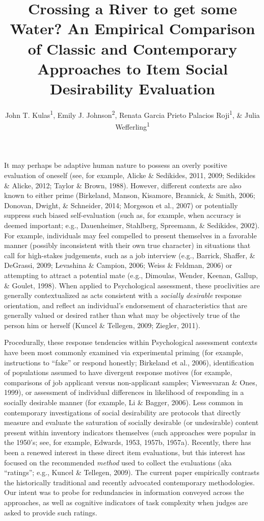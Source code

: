 \documentclass[
  english,
  ,jou]{apa6}
\title{Crossing a River to get some Water? An Empirical Comparison of Classic and Contemporary Approaches to Item Social Desirability Evaluation}
\author{John T. Kulas\textsuperscript{1}, Emily J. Johnson\textsuperscript{2}, Renata Garcia Prieto Palacios Roji\textsuperscript{1}, \& Julia Wefferling\textsuperscript{1}}
\date{}
\affiliation{\vspace{0.5cm}\textsuperscript{1} Montclair State University\\\textsuperscript{2} St.~Cloud State University}
\begin{document}
\maketitle

It may perhaps be adaptive human nature to possess an overly positive evaluation of oneself (see, for example, Alicke \& Sedikides, 2011, 2009; Sedikides \& Alicke, 2012; Taylor \& Brown, 1988). However, different contexts are also known to either prime (Birkeland, Manson, Kisamore, Brannick, \& Smith, 2006; Donovan, Dwight, \& Schneider, 2014; Morgeson et al., 2007) or potentially suppress such biased self-evaluation (such as, for example, when accuracy is deemed important; e.g., Dauenheimer, Stahlberg, Spreemann, \& Sedikides, 2002). For example, individuals may feel compelled to present themselves in a favorable manner (possibly inconsistent with their own true character) in situations that call for high-stakes judgements, such as a job interview (e.g., Barrick, Shaffer, \& DeGrassi, 2009; Levashina \& Campion, 2006; Weiss \& Feldman, 2006) or attempting to attract a potential mate (e.g., Dimoulas, Wender, Keenan, Gallup, \& Goulet, 1998). When applied to Psychological assessment, these proclivities are generally contextualized as acts consistent with a \emph{socially desirable} response orientation, and reflect an individual's endorsement of characteristics that are generally valued or desired rather than what may be objectively true of the person him or herself (Kuncel \& Tellegen, 2009; Ziegler, 2011).

Procedurally, these response tendencies within Psychological assessment contexts have been most commonly examined via experimental priming (for example, instructions to ``fake'' or respond honestly; Birkeland et al., 2006), identification of populations assumed to have divergent response motives (for example, comparisons of job applicant versus non-applicant samples; Viswesvaran \& Ones, 1999), or assessment of individual differences in likelihood of responding in a socially desirable manner (for example, Li \& Bagger, 2006). Less common in contemporary investigations of social desirability are protocols that directly measure and evaluate the saturation of socially desirable (or undesirable) content present within inventory indicators themselves (such approaches were popular in the 1950's; see, for example, Edwards, 1953, 1957b, 1957a). Recently, there has been a renewed interest in these direct item evaluations, but this interest has focused on the recommended \emph{method} used to collect the evaluations (aka ``ratings''; e.g., Kuncel \& Tellegen, 2009). The current paper empirically contrasts the historically traditional and recently advocated contemporary methodologies. Our intent was to probe for redundancies in information conveyed across the approaches, as well as cognitive indicators of task complexity when judges are asked to provide such ratings.
\end{document}
